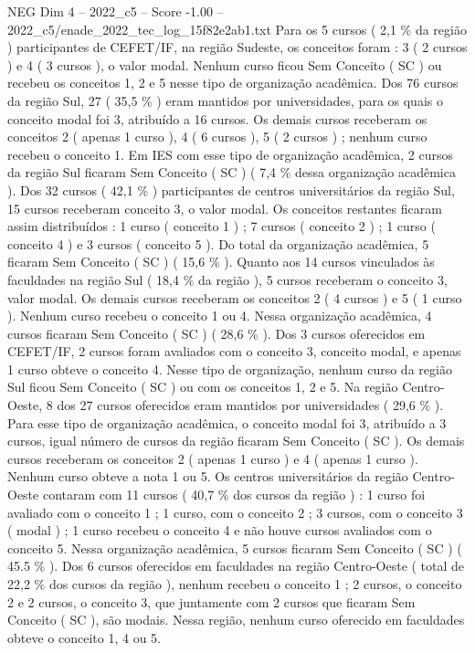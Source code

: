 \begin{textsample}{NEG Dim 4 – 2022\_c5 – Score -1.00 – 2022\_c5/enade\_2022\_tec\_log\_15f82e2ab1.txt}
Para os 5 cursos ( 2,1 \% da região ) participantes de CEFET/IF, na região Sudeste, os conceitos foram : 3 ( 2 cursos ) e 4 ( 3 cursos ), o valor modal.
Nenhum curso ficou Sem Conceito ( SC ) ou recebeu os conceitos 1, 2 e 5 nesse tipo de organização acadêmica.
Dos 76 cursos da região Sul, 27 ( 35,5 \% ) eram mantidos por universidades, para os quais o conceito modal foi 3, atribuído a 16 cursos.
Os demais cursos receberam os conceitos 2 ( apenas 1 curso ), 4 ( 6 cursos ), 5 ( 2 cursos ) ; nenhum curso recebeu o conceito 1.
Em IES com esse tipo de organização acadêmica, 2 cursos da região Sul ficaram Sem Conceito ( SC ) ( 7,4 \% dessa organização acadêmica ).
Dos 32 cursos ( 42,1 \% ) participantes de centros universitários da região Sul, 15 cursos receberam conceito 3, o valor modal.
Os conceitos restantes ficaram assim distribuídos : 1 curso ( conceito 1 ) ; 7 cursos ( conceito 2 ) ; 1 curso ( conceito 4 ) e 3 cursos ( conceito 5 ).
Do total da organização acadêmica, 5 ficaram Sem Conceito ( SC ) ( 15,6 \% ).
Quanto aos 14 cursos vinculados às faculdades na região Sul ( 18,4 \% da região ), 5 cursos receberam o conceito 3, valor modal.
Os demais cursos receberam os conceitos 2 ( 4 cursos ) e 5 ( 1 curso ).
Nenhum curso recebeu o conceito 1 ou 4.
Nessa organização acadêmica, 4 cursos ficaram Sem Conceito ( SC ) ( 28,6 \% ).
Dos 3 cursos oferecidos em CEFET/IF, 2 cursos foram avaliados com o conceito 3, conceito modal, e apenas 1 curso obteve o conceito 4.
Nesse tipo de organização, nenhum curso da região Sul ficou Sem Conceito ( SC ) ou com os conceitos 1, 2 e 5.
Na região Centro-Oeste, 8 dos 27 cursos oferecidos eram mantidos por universidades ( 29,6 \% ).
Para esse tipo de organização acadêmica, o conceito modal foi 3, atribuído a 3 cursos, igual número de cursos da região ficaram Sem Conceito ( SC ).
Os demais cursos receberam os conceitos 2 ( apenas 1 curso ) e 4 ( apenas 1 curso ).
Nenhum curso obteve a nota 1 ou 5.
Os centros universitários da região Centro-Oeste contaram com 11 cursos ( 40,7 \% dos cursos da região ) : 1 curso foi avaliado com o conceito 1 ; 1 curso, com o conceito 2 ; 3 cursos, com o conceito 3 ( modal ) ; 1 curso recebeu o conceito 4 e não houve cursos avaliados com o conceito 5.
Nessa organização acadêmica, 5 cursos ficaram Sem Conceito ( SC ) ( 45.5 \% ).
Dos 6 cursos oferecidos em faculdades na região Centro-Oeste ( total de 22,2 \% dos cursos da região ), nenhum recebeu o conceito 1 ; 2 cursos, o conceito 2 e 2 cursos, o conceito 3, que juntamente com 2 cursos que ficaram Sem Conceito ( SC ), são modais.
Nessa região, nenhum curso oferecido em faculdades obteve o conceito 1, 4 ou 5.

\end{textsample}
